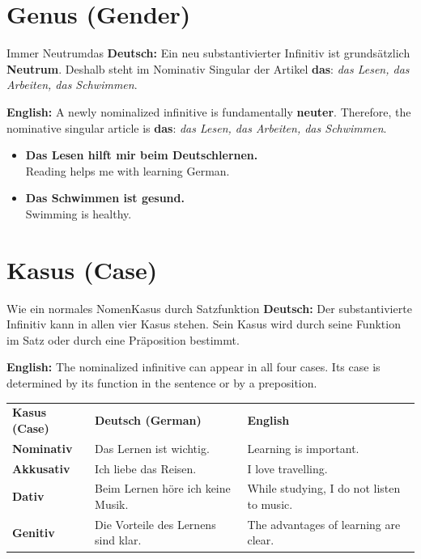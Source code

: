 \documentclass[a4paper,11pt]{article}
\newcommand{\GermanText}[1]{\textbf{Deutsch: }#1\par}
\newcommand{\EnglishText}[1]{{\small\color{SoftGray}\textbf{English: }#1\par}}
\newcommand{\ExampleItem}[2]{\item \textbf{#1}\\{\small\color{SoftGray}#2}}
\begin{document}
\section{Genus \textnormal{(Gender)}}
\begin{grammarentry}{Immer Neutrum}{das}
\GermanText{Ein neu substantivierter Infinitiv ist grundsätzlich \textbf{Neutrum}. Deshalb steht im Nominativ Singular der Artikel \textbf{das}: \textit{das Lesen, das Arbeiten, das Schwimmen}.}
\EnglishText{A newly nominalized infinitive is fundamentally \textbf{neuter}. Therefore, the nominative singular article is \textbf{das}: \textit{das Lesen, das Arbeiten, das Schwimmen}.}
\end{grammarentry}

\begin{exbox}
\begin{itemize}
\ExampleItem{Das Lesen hilft mir beim Deutschlernen.}{Reading helps me with learning German.}
\ExampleItem{Das Schwimmen ist gesund.}{Swimming is healthy.}
\end{itemize}
\end{exbox}

\section{Kasus \textnormal{(Case)}}
\begin{grammarentry}{Wie ein normales Nomen}{Kasus durch Satzfunktion}
\GermanText{Der substantivierte Infinitiv kann in allen vier Kasus stehen. Sein Kasus wird durch seine Funktion im Satz oder durch eine Präposition bestimmt.}
\EnglishText{The nominalized infinitive can appear in all four cases. Its case is determined by its function in the sentence or by a preposition.}
\end{grammarentry}

\begin{longtable}{>{\bfseries}p{2.6cm}|p{5.4cm}|p{5.3cm}}
\rowcolor{HeaderBlueDark}
\color{white}\textbf{Kasus (Case)} & \color{white}\textbf{Deutsch (German)} & \color{white}\textbf{English} \\
Nominativ & Das Lernen ist wichtig. & Learning is important. \\
Akkusativ & Ich liebe das Reisen. & I love travelling. \\
Dativ & Beim Lernen höre ich keine Musik. & While studying, I do not listen to music. \\
Genitiv & Die Vorteile des Lernens sind klar. & The advantages of learning are clear. \\
\end{longtable}
\end{document}
